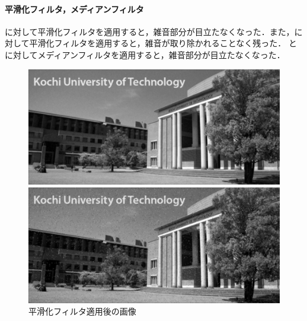 \paragraph{平滑化フィルタ，メディアンフィルタ}
\wgnimg に対して平滑化フィルタを適用すると，雑音部分が目立たなくなった．また，\inimg に対して平滑化フィルタを適用すると，雑音が取り除かれることなく残った．
\wgnimg と\inimg に対してメディアンフィルタを適用すると，雑音部分が目立たなくなった．
\begin{figure}[H]
    \centering
    \begin{minipage}[b]{.49\textwidth}
        \begin{minipage}[b]{.49\textwidth}
            \includegraphics[keepaspectratio,width=\textwidth]{../../Figures/06_21_sf_img_wgn.png}
            \subcaption{\wgnimg}
        \end{minipage}
        \begin{minipage}[b]{.49\textwidth}
            \includegraphics[keepaspectratio,width=\textwidth]{../../Figures/06_22_sf_img_in.png}
            \subcaption{\inimg}
        \end{minipage}
        \caption{平滑化フィルタ適用後の画像}
    \end{minipage}
    \begin{minipage}[b]{.49\textwidth}
        \begin{minipage}[b]{.49\textwidth}

\end{minipage}
\end{minipage}
\end{figure}
